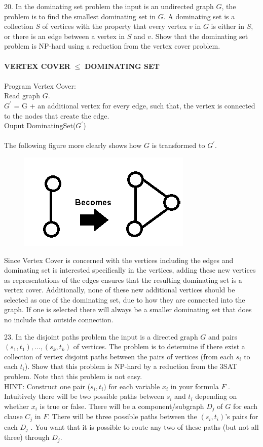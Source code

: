 \documentclass[10pt]{article}
\newcommand{\tab}{\hspace*{2em}}
\begin{document}
\newpage

20. In the dominating set problem the input is an undirected graph $G$, the problem is to find the smallest
dominating set in $G$. A dominating set is a collection $S$ of vertices with the property that every vertex
$v$ in $G$ is either in $S$, or there is an edge between a vertex in $S$ and $v$. Show that the dominating set
problem is NP-hard using a reduction from the vertex cover problem.\\
\\
\textbf{VERTEX COVER} $\leq$ \textbf{DOMINATING SET}\\
\\
Program Vertex Cover:\\
\tab Read graph $G$.\\
\tab $G^\prime$ = G + an additional vertex for every edge, such that, the vertex is connected to the nodes that create the edge.\\
\tab Ouput DominatingSet($G^\prime$)\\
\\
The following figure more clearly shows how $G$ is transformed to $G^\prime$. 
\begin{figure}[h]
	\centering
		\includegraphics{red20.png}
	\label{fig:red20}
\end{figure}
Since Vertex Cover is concerned with the vertices including the edges and dominating set is interested specifically in the vertices,
adding these new vertices as representations of the edges ensures that the resulting dominating set is a vertex cover. Additionally,
none of these new additional vertices should be selected as one of the dominating set, due to how they are connected into the graph. 
If one is selected there will always be a smaller dominating set that does no include that outside connection. 

\newpage

23. In the disjoint paths problem the input is a directed graph $G$ and pairs $(s_1, t_1), \ldots, (s_k, t_k)$ of vertices.
The problem is to determine if there exist a collection of vertex disjoint paths between the pairs of
vertices (from each $s_i$ to each $t_i$). Show that this problem is NP-hard by a reduction from the 3SAT
problem. Note that this problem is not easy.\\
HINT: Construct one pair ($s_i, t_i)$ for each variable $x_i$ in your formula $F$ . Intuitively there will be
two possible paths between $s_i$ and $t_i$ depending on whether $x_i$ is true or false. There will be a
component/subgraph $D_j$ of $G$ for each clause $C_j$ in $F$. There will be three possible paths between the
$(s_i, t_i)$'s pairs for each $D_j$ . You want that it is possible to route any two of these paths (but not all
three) through $D_j$.
\newpage
\end{document}

